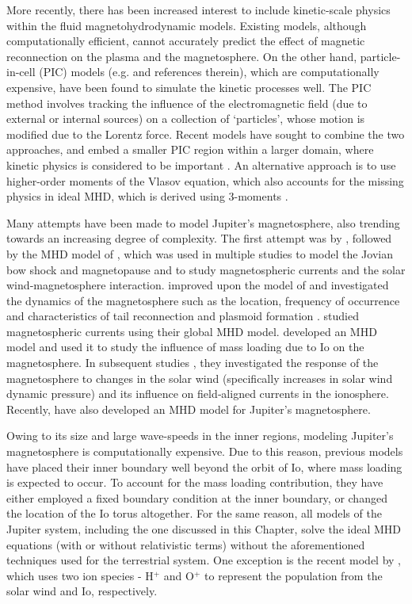 More recently, there has been increased interest to include kinetic-scale physics within the fluid magnetohydrodynamic models. Existing models, although computationally efficient, cannot accurately predict the effect of magnetic reconnection on the plasma and the magnetosphere. On the other hand, particle-in-cell (PIC) models (e.g.  and references therein), which are computationally expensive, have been found to simulate the kinetic processes well. The PIC method involves tracking the influence of the electromagnetic field (due to external or internal sources) on a collection of `particles', whose motion is modified due to the Lorentz force. Recent models have sought to combine the two approaches, and embed a smaller PIC region within a larger domain, where kinetic physics is considered to be important \cite{Daldorff2014Two-wayModel}. An alternative approach is to use higher-order moments of the Vlasov equation, which also accounts for the missing physics in ideal MHD, which is derived using 3-moments \cite{Wang2015ComparisonReconnection}.

Many attempts have been made to model Jupiter's magnetosphere, also trending towards an increasing degree of complexity. The first attempt was by , followed by the MHD model of , which was used in multiple studies to model the Jovian bow shock and magnetopause  and to study magnetospheric currents and the solar wind‐magnetosphere interaction.  improved upon the model of   and investigated the dynamics of the magnetosphere such as the location, frequency of occurrence and characteristics of tail reconnection and plasmoid formation \cite{Fukazawa2010a}. \cite{Moriguchi2008} studied magnetospheric currents using their global MHD model. \cite{Chane2013a} developed an MHD model and used it to study the influence of mass loading due to Io on the magnetosphere. In subsequent studies \cite{Chane2017a,Chane2018}, they investigated the response of the magnetosphere to changes in the solar wind (specifically increases in solar wind dynamic pressure) and its influence on field‐aligned currents in the ionosphere. Recently,  have also developed an MHD model for Jupiter's magnetosphere. 

Owing to its size and large wave-speeds in the inner regions, modeling Jupiter's magnetosphere is computationally expensive. Due to this reason, previous models have placed their inner boundary well beyond the orbit of Io, where mass loading is expected to occur. To account for the mass loading contribution, they have either employed a fixed boundary condition at the inner boundary, or changed the location of the Io torus altogether. For the same reason, all models of the Jupiter system, including the one discussed in this Chapter, solve the ideal MHD equations (with or without relativistic terms) without the aforementioned techniques used for the terrestrial system. One exception is the recent model by , which uses two ion species - H$^+$ and O$^+$ to represent the population from the solar wind and Io, respectively. 

